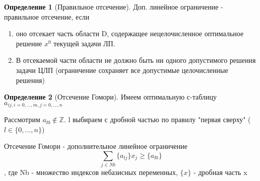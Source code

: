 \documentclass[a4paper]{article}
\theoremstyle{definition}
\newtheorem*{definition}{Определение}
\theoremstyle{remark}
\begin{document}
\begin{definition}[Правильное отсечение]
	Доп. линейное ограничение - правильное отсечение, если
	\begin{enumerate}
		\item оно отсекает часть области D, содержащее нецелочисленное оптимальное решение $x^0$ текущей задачи ЛП.
		\item В отсекаемой части области не должно быть ни одного допустимого решения задачи ЦЛП (ограничение сохраняет все допустимые целочисленные решения)
	\end{enumerate}
\end{definition}
\begin{definition}[Отсечение Гомори]
	Имеем оптимальную с-таблицу $a_{ij, i = 0, \dots, m, j = 0, \dots, n}$

	Рассмотрим $a_{l0}\notin \mathbb{Z}$. l выбираем с дробной частью по правилу "первая сверху" ($l\in \{0, \dots, n\}$)

	Отсечение Гомори - дополнительное линейное ограничение
	\[\sum_{j\in Nb} \{a_{lj}\}x_j \geq \{a_{l0}\}\], где Nb - множество индексов небазисных переменных, $\{x\}$ - дробная часть x
\end{definition}
\end{document}
